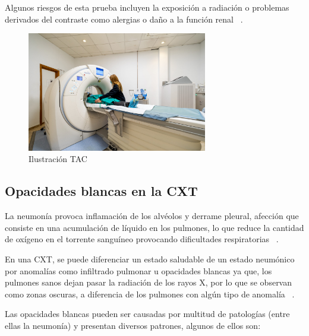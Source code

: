 Algunos riesgos de esta prueba incluyen la exposición a radiación o problemas derivados del contraste como alergias o daño a la función renal ~\cite{MedPlusTAC24}.

\begin{figure}[h]
    \centering
    \includegraphics[width=0.70\textwidth]{img/TAC.jpg}
    \caption{Ilustración TAC ~\cite{HosPa24}}
    \label{fig:TAC}
\end{figure}
\FloatBarrier

\subsection{Opacidades blancas en la CXT}

La neumonía provoca inflamación de los alvéolos y derrame pleural, afección que consiste en una acumulación de líquido en los pulmones, lo que reduce la cantidad de oxígeno en el torrente sanguíneo provocando dificultades respiratorias ~\cite{kundu2021pneumonia}.

En una CXT, se puede diferenciar un estado saludable de un estado neumónico por anomalías como infiltrado pulmonar u opacidades blancas ya que, los pulmones sanos dejan pasar la radiación de los rayos X, por lo que se observan como zonas oscuras, a diferencia de los pulmones con algún tipo de anomalía ~\cite{gelaw15}.

Las opacidades blancas pueden ser causadas por multitud de patologías (entre ellas la neumonía) y presentan diversos patrones, algunos de ellos son:

